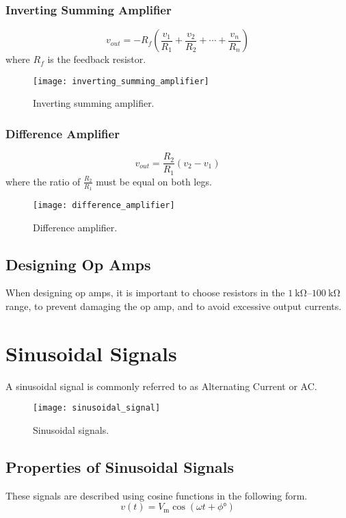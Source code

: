 \documentclass{article}
\begin{document}
\subsubsection{Inverting Summing Amplifier}
\begin{equation*}
    v_{out} = -R_f \left( \frac{v_1}{R_1} + \frac{v_2}{R_2} + \cdots + \frac{v_n}{R_n} \right)
\end{equation*}
where $R_f$ is the feedback resistor.
\begin{figure}[H]
    \centering
    \texttt{[image: inverting\_summing\_amplifier]}
    \caption{Inverting summing amplifier.}
\end{figure}
\subsubsection{Difference Amplifier}
\begin{equation*}
    v_{out} = \frac{R_2}{R_1} \left( v_2 - v_1 \right)
\end{equation*}
where the ratio of $\displaystyle \frac{R_2}{R_1}$ must be equal on both legs.
\begin{figure}[H]
    \centering
    \texttt{[image: difference\_amplifier]}
    \caption{Difference amplifier.}
\end{figure}
\subsection{Designing Op Amps}
When designing op amps, it is important to choose resistors in the $\qtyrange{1}{100}{\kilo\ohm}$
range, to prevent damaging the op amp, and to avoid excessive output currents.
\newpage
\section{Sinusoidal Signals}
\begin{definition}
    A sinusoidal signal is commonly referred to as Alternating Current or AC.
\end{definition}
\begin{figure}[H]
    \centering
    \texttt{[image: sinusoidal\_signal]}
    \caption{Sinusoidal signals.}
\end{figure}
\subsection{Properties of Sinusoidal Signals}
These signals are described using cosine functions in the following form.
\begin{equation*}
    v(t) = V_{\mathrm{m}} \cos{\left( \omega t + \phi\si{\degree} \right)}
\end{equation*}
\end{document}
